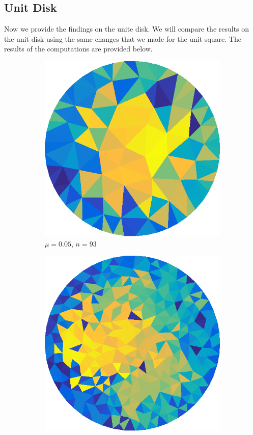 \documentclass[../fem.tex]{subfile}
\begin{document}
\subsection{Unit Disk}%
\label{sub:unit_disk}

Now we provide the findings on the unite disk. We will compare the results on
the unit disk using the same changes that we made for the unit square. The
results of the computations are provided below.

\begin{figure}[htpb]
  \centering
  \begin{subfigure}{0.4\textwidth}
    \centering
    \includegraphics[width=0.8\linewidth]{figures/c1a/tri.png}
    \caption{$\mu=0.05$, $n=93$}
  \end{subfigure}
  \begin{subfigure}{0.4\textwidth}
    \centering
    \includegraphics[width=0.8\linewidth]{figures/c1b/tri.png}

\end{subfigure}
\end{figure}
\end{document}
